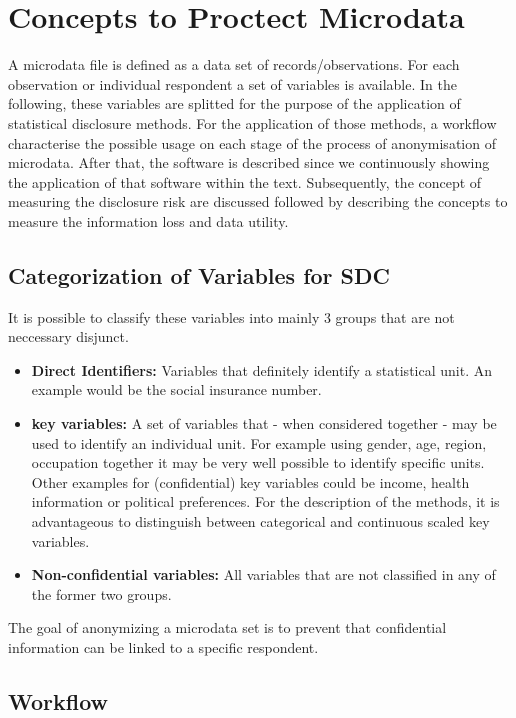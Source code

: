 \documentclass[12pt]{article}
\begin{document}
\section{Concepts to Proctect Microdata}\label{overview:methods}
A microdata file is defined as a data set of records/observations. For each observation 
or individual respondent a set of variables is available. 	
In the following, these variables are splitted for the purpose of the application of 
statistical disclosure methods. For the application of those methods, a workflow characterise the 
possible usage on each stage of the process of anonymisation of microdata. 
After that, the software is described since
we continuously showing the application of that software within the text. 
Subsequently, the concept of measuring the 
disclosure risk are discussed followed by describing the concepts to measure the information loss
and data utility.


\subsection{Categorization of Variables for SDC}

It is possible to classify these variables into mainly 3 groups that are not neccessary disjunct.  

\begin{itemize}
	\item \textbf{Direct Identifiers:} Variables that definitely identify a statistical unit. An example would be the social insurance number.  
	\item \textbf{key variables:} A set of variables that - when considered together - may be used to identify an 
	individual unit. For example using gender, age, region, occupation together it may be very well possible 
	to identify specific units. 
	Other examples for (confidential) key variables could be income, health information or political preferences. 
	For the description of the methods, it is advantageous
	to distinguish between categorical and continuous scaled key variables.
	\item \textbf{Non-confidential variables:} All variables that are not classified in any of the former two groups.
\end{itemize}



The goal of anonymizing a microdata set is to prevent that confidential information 
can be linked to a specific respondent. 


\subsection{Workflow}
\end{document}
